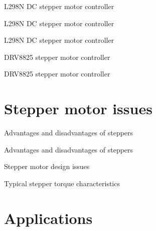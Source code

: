 \documentclass[compress]{beamer}
\begin{document}
{
    \begin{frame}{L298N DC stepper motor controller}
    \end{frame}
}

{
    \begin{frame}{L298N DC stepper motor controller}
    \end{frame}
}

{
    \begin{frame}{L298N DC stepper motor controller}
    \end{frame}
}

{
    \begin{frame}{DRV8825 stepper motor controller}
    \end{frame}
}

{
    \begin{frame}{DRV8825 stepper motor controller}
    \end{frame}
}

\section{Stepper motor issues}

{
    \begin{frame}{Advantages and disadvantages of steppers}
    \end{frame}
}

{
    \begin{frame}{Advantages and disadvantages of steppers}
    \end{frame}
}
{
    \begin{frame}{Stepper motor design issues}
    \end{frame}
}

{
    \begin{frame}{Typical stepper torque characteristics}
    \end{frame}
}

\section{Applications}
\end{document}
